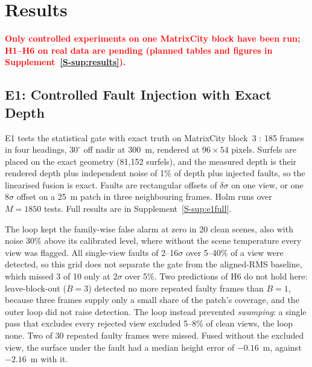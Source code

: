 \section{Results}
\label{sec:results}
\textcolor{red}{\textbf{Only controlled experiments on one MatrixCity block have been run; H1--H6 on real
data are pending (planned tables and figures in Supplement~\ref{S-sup:results}).}}

\subsection{E1: Controlled Fault Injection with Exact Depth}
\label{sec:results:e1}
E1 tests the statistical gate with exact truth on MatrixCity block~3 \cite{data_matrixcity}: 185 frames in
four headings, $30^{\circ}$ off nadir at 300~m, rendered at $96\times54$ pixels. Surfels are placed on the
exact geometry (81{,}152 surfels), and the measured depth is their rendered depth plus independent noise of
1\% of depth plus injected faults, so the linearised fusion is exact. Faults are rectangular offsets of
$\delta\sigma$ on one view, or one $8\sigma$ offset on a 25~m patch in three neighbouring frames. Holm runs
over $M=1850$ tests. Full results are in Supplement~\ref{S-sup:e1full}.

The loop kept the family-wise false alarm at zero in 20 clean scenes, also with noise 30\% above its
calibrated level, where without the scene temperature every view was flagged. All single-view faults of
2--16$\sigma$ over 5--40\% of a view were detected, so this grid does not separate the gate from the
aligned-RMS baseline, which missed 3 of 10 only at $2\sigma$ over 5\%. Two predictions of H6 do not hold
here: leave-block-out ($B=3$) detected no more repeated faulty frames than $B=1$, because three frames
supply only a small share of the patch's coverage, and the outer loop did not raise detection. The loop
instead prevented \emph{swamping}: a single pass that excludes every rejected view excluded 5--8\% of clean
views, the loop none. Two of 30 repeated faulty frames were missed. Fused without the excluded view, the
surface under the fault had a median height error of $-0.16$~m, against $-2.16$~m with it.


